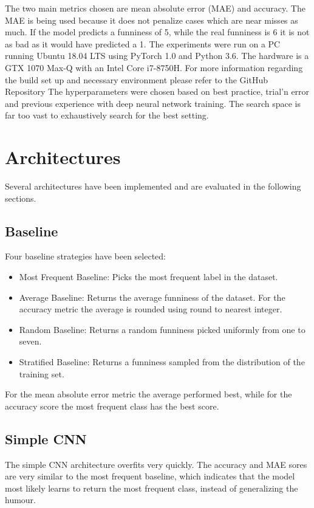\documentclass[draft,final,oneside]{vutinfth} %
\begin{document}
The two main metrics chosen are mean absolute error (MAE) and accuracy. The MAE
is being used because it does not penalize cases which are near misses as much. If the
model predicts a funniness of 5, while the real funniness is 6 it is not as bad as it would
have predicted a 1.
The experiments were run on a PC running Ubuntu 18.04 LTS using PyTorch 1.0 and
Python 3.6. The hardware is a GTX 1070 Max-Q with an Intel Core i7-8750H. For more
information regarding the build set up and necessary environment please refer to the
GitHub Repository
The hyperparameters were chosen based on best practice, trial’n error and previous
experience with deep neural network training. The search space is far too vast to
exhaustively search for the best setting.


\section{Architectures}
Several architectures have been implemented and are evaluated in the following sections.


\subsection{Baseline}

Four baseline strategies have been selected: 

\begin{itemize}

\item Most Frequent Baseline: Picks the most frequent label in the dataset.
\item Average Baseline: Returns the average funniness of the dataset. For the accuracy metric the average is rounded using round to nearest integer.
\item Random Baseline: Returns a random funniness picked uniformly from one to seven.
\item Stratified Baseline: Returns a funniness sampled from the distribution of the
training set.

\end{itemize}

For the mean absolute error metric the average performed best, while for the accuracy
score the most frequent class has the best score.

\subsection{Simple CNN}
The simple CNN architecture overfits very quickly. The accuracy and MAE sores are
very similar to the most frequent baseline, which indicates that the model most likely
learns to return the most frequent class, instead of generalizing the humour.
\end{document}
